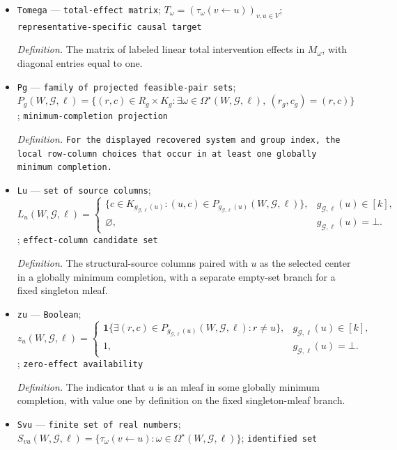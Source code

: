 \documentclass{article}
\begin{document}
\begin{itemize}
  \par\smallskip\noindent\emph{Definition.} \texttt{The choices reconstructing every minimum-\allowbreak{}edge DOG representative.}
  \item \texttt{Tomega} --- \texttt{total-\allowbreak{}effect matrix}; \(T_{\omega}=(\tau_{\omega}(v\leftarrow u))_{v,u\in V}\); \texttt{representative-\allowbreak{}specific causal target}
  \par\smallskip\noindent\emph{Definition.} The matrix of labeled linear total intervention effects in \(M_{\omega}\), with diagonal entries equal to one.
  \item \texttt{Pg} --- \texttt{family of projected feasible-\allowbreak{}pair sets}; \(P_g(W,\mathcal G,\ell)=\{(r,c)\in R_g\times K_g:\exists\omega\in\Omega^{\star}(W,\mathcal G,\ell),\ (r_g,c_g)=(r,c)\}\); \texttt{minimum-\allowbreak{}completion projection}
  \par\smallskip\noindent\emph{Definition.} \texttt{For the displayed recovered system and group index,\allowbreak{} the local row-\allowbreak{}column choices that occur in at least one globally minimum completion.}
  \item \texttt{Lu} --- \texttt{set of source columns}; \(L_u(W,\mathcal G,\ell)=\begin{cases}\{c\in K_{g_{\mathcal G,\ell}(u)}:(u,c)\in P_{g_{\mathcal G,\ell}(u)}(W,\mathcal G,\ell)\},&g_{\mathcal G,\ell}(u)\in[k],\\\varnothing,&g_{\mathcal G,\ell}(u)=\bot.\end{cases}\); \texttt{effect-\allowbreak{}column candidate set}
  \par\smallskip\noindent\emph{Definition.} The structural-source columns paired with \(u\) as the selected center in a globally minimum completion, with a separate empty-set branch for a fixed singleton mleaf.
  \item \texttt{zu} --- \texttt{Boolean}; \(z_u(W,\mathcal G,\ell)=\begin{cases}\mathbf 1\{\exists(r,c)\in P_{g_{\mathcal G,\ell}(u)}(W,\mathcal G,\ell):r\ne u\},&g_{\mathcal G,\ell}(u)\in[k],\\1,&g_{\mathcal G,\ell}(u)=\bot.\end{cases}\); \texttt{zero-\allowbreak{}effect availability}
  \par\smallskip\noindent\emph{Definition.} The indicator that \(u\) is an mleaf in some globally minimum completion, with value one by definition on the fixed singleton-mleaf branch.
  \item \texttt{Svu} --- \texttt{finite set of real numbers}; \(S_{vu}(W,\mathcal G,\ell)=\{\tau_{\omega}(v\leftarrow u):\omega\in\Omega^{\star}(W,\mathcal G,\ell)\}\); \texttt{identified set}

\end{itemize}
\end{document}
